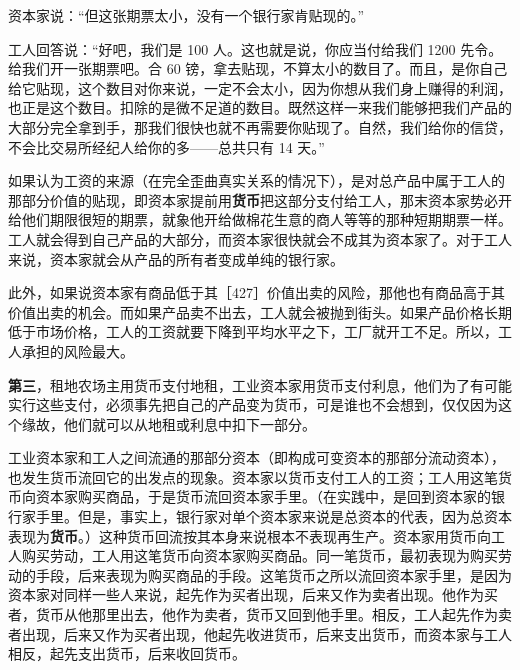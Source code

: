 资本家说：“但这张期票太小，没有一个银行家肯贴现的。”

工人回答说：“好吧，我们是 100 人。这也就是说，你应当付给我们 1200 先令。给我们开一张期票吧。合 60 镑，拿去贴现，不算太小的数目了。而且，是你自己给它贴现，这个数目对你来说，一定不会太小，因为你想从我们身上赚得的利润，也正是这个数目。扣除的是微不足道的数目。既然这样一来我们能够把我们产品的大部分完全拿到手，那我们很快也就不再需要你贴现了。自然，我们给你的信贷，不会比交易所经纪人给你的多——总共只有 14 天。”

如果认为工资的来源（在完全歪曲真实关系的情况下），是对总产品中属于工人的那部分价值的贴现，即资本家提前用\textbf{货币}把这部分支付给工人，那末资本家势必开给他们期限很短的期票，就象他开给做棉花生意的商人等等的那种短期期票一样。工人就会得到自己产品的大部分，而资本家很快就会不成其为资本家了。对于工人来说，资本家就会从产品的所有者变成单纯的银行家。

此外，如果说资本家有商品低于其［427］价值出卖的风险，那他也有商品高于其价值出卖的机会。而如果产品卖不出去，工人就会被抛到街头。如果产品价格长期低于市场价格，工人的工资就要下降到平均水平之下，工厂就开工不足。所以，工人承担的风险最大。

\textbf{第三}，租地农场主用货币支付地租，工业资本家用货币支付利息，他们为了有可能实行这些支付，必须事先把自己的产品变为货币，可是谁也不会想到，仅仅因为这个缘故，他们就可以从地租或利息中扣下一部分。\fontbox{\}~}


工业资本家和工人之间流通的那部分资本（即构成可变资本的那部分流动资本），也发生货币流回它的出发点的现象。资本家以货币支付工人的工资；工人用这笔货币向资本家购买商品，于是货币流回资本家手里。（在实践中，是回到资本家的银行家手里。但是，事实上，银行家对单个资本家来说是总资本的代表，因为总资本表现为\textbf{货币}。）这种货币回流按其本身来说根本不表现再生产。资本家用货币向工人购买劳动，工人用这笔货币向资本家购买商品。同一笔货币，最初表现为购买劳动的手段，后来表现为购买商品的手段。这笔货币之所以流回资本家手里，是因为资本家对同样一些人来说，起先作为买者出现，后来又作为卖者出现。他作为买者，货币从他那里出去，他作为卖者，货币又回到他手里。相反，工人起先作为卖者出现，后来又作为买者出现，他起先收进货币，后来支出货币，而资本家与工人相反，起先支出货币，后来收回货币。

